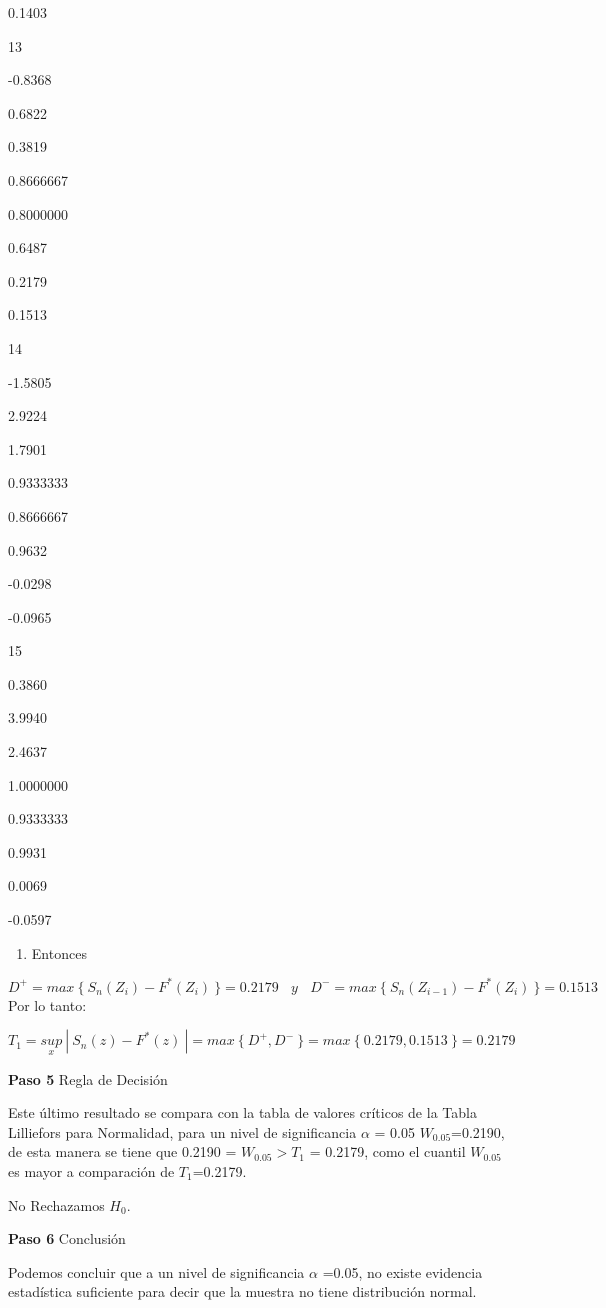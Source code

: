 \documentclass[
  a4paper,
  oneside,
  openany]{book}
\providecommand{\tightlist}{%
  \setlength{\itemsep}{0pt}\setlength{\parskip}{0pt}}
\begin{document}
0.1403

13

-0.8368

0.6822

0.3819

0.8666667

0.8000000

0.6487

0.2179

0.1513

14

-1.5805

2.9224

1.7901

0.9333333

0.8666667

0.9632

-0.0298

-0.0965

15

0.3860

3.9940

2.4637

1.0000000

0.9333333

0.9931

0.0069

-0.0597

\begin{enumerate}
\def\labelenumi{\arabic{enumi})}
\setcounter{enumi}{8}
\tightlist
\item
  Entonces
\end{enumerate}

\[ D^+= max\ \{\ S_{n}(Z_{i})-F^*(Z_{i}) \ \}= 0.2179 \ \ \ \ y\ \ \ \ D^-= max\ \{ \ S_{n}(Z_{i-1})-F^*(Z_{i}) \ \}=0.1513 \]
Por lo tanto:

\[T_{1}=\underset{x}{sup}\ | \ S_{n}(z)-F^*(z) \ |=max \ \{\ D^+,D^- \ \}=max \ \{ \  0.2179,0.1513 \ \}=0.2179 \]

\textbf{Paso 5} Regla de Decisión

Este último resultado se compara con la tabla de valores críticos de la Tabla Lilliefors para Normalidad, para un nivel de significancia \(\alpha\) = 0.05 \(W_{0.05}\)=0.2190, de esta manera se tiene que 0.2190 = \(W_{0.05} > T_{1}\) = 0.2179, como el cuantil \(W_{0.05}\) es mayor a comparación de \(T_{1}\)=0.2179.

No Rechazamos \(H_0\).

\textbf{Paso 6} Conclusión

Podemos concluir que a un nivel de significancia \(\alpha\) =0.05, no existe evidencia estadística suficiente para decir que la muestra no tiene distribución normal.
\end{document}
